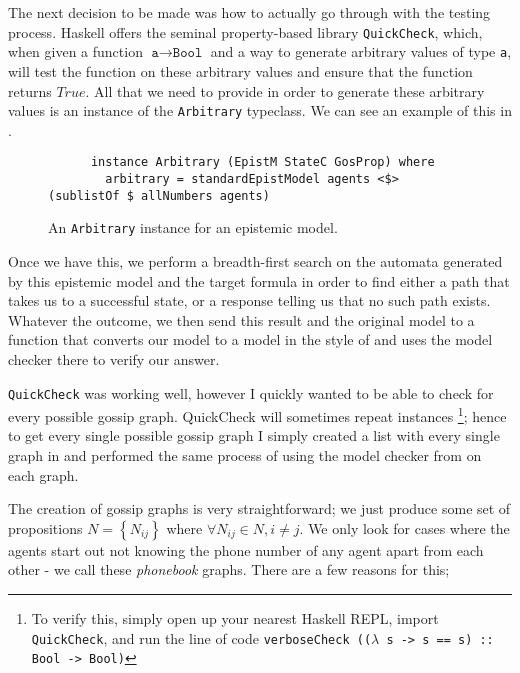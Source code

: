 \documentclass[12pt, a4paper]{article}
\begin{document}
The next decision to be made was how to actually go through with the testing
process. Haskell offers the seminal property-based library \texttt{QuickCheck},
which, when given a function $\texttt{a} \rightarrow \texttt{Bool}$ and a way to
generate arbitrary values of type \texttt{a}, will test the function on these
arbitrary values and ensure that the function returns $True$. All that we need
to provide in order to generate these arbitrary values is an instance of the
\texttt{Arbitrary} typeclass. We can see an example of this in .

\begin{figure}[h]
  \centering
  \begin{verbatim}
      instance Arbitrary (EpistM StateC GosProp) where
        arbitrary = standardEpistModel agents <$> (sublistOf $ allNumbers agents)
  \end{verbatim}
  \caption{An \texttt{Arbitrary} instance for an epistemic model.}
  \label{fig:Arbitrary}
\end{figure}

Once we have this, we perform a breadth-first search on the automata generated
by this epistemic model and the target formula in order to find either a path
that takes us to a successful state, or a response telling us that no such path
exists. Whatever the outcome, we then send this result and the original model to
a function that converts our model to a model in the style of
\cite{GithubGossip} and uses the model checker there to verify our answer.

\bigskip

\texttt{QuickCheck} was working well, however I quickly wanted to be able to
check for every possible gossip graph. QuickCheck will sometimes repeat
instances \footnote{To verify this, simply open up your nearest Haskell REPL,
  import \texttt{QuickCheck}, and run the line of code \texttt{verboseCheck
    (($\lambda$ s -> s == s) :: Bool -> Bool)}}; hence to get every single
possible gossip graph I simply created a list with every single graph in and
performed the same process of using the model checker from \cite{GithubGossip}
on each graph.

\bigskip

The creation of gossip graphs is very straightforward; we just produce some set
of propositions $N = \left\{ N_{ij} \right\}$ where $\forall N_{ij} \in N, i
\not = j$. We only look for cases where the agents start out not knowing the
phone number of any agent apart from each other - we call these
\textit{phonebook} graphs. There are a few reasons for this;
\end{document}
